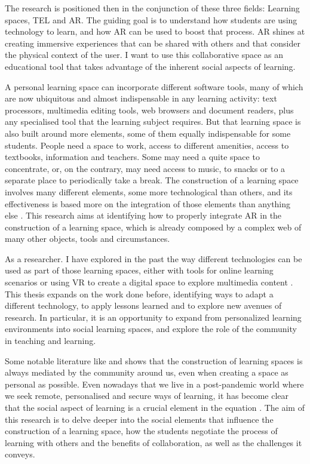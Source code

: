 The research is positioned then in the conjunction of these three fields: Learning spaces, \ac{TEL} and \ac{AR}. The guiding goal is to
understand how students are using technology to learn, and how \ac{AR} can be used to boost that process. \ac{AR} shines at creating
immersive experiences that can be shared with others and that consider the physical context of the user. I want to use this collaborative
space as an educational tool that takes advantage of the inherent social aspects of learning.

A personal learning space can incorporate different software tools, many of which  are now ubiquitous and almost
indispensable in any learning activity: text processors, multimedia editing tools, web browsers and document readers, plus any
specialised tool that the learning subject requires. But that learning space is also built around more elements, some of them equally
indispensable for some students. People need a space to work, access to different amenities, access to textbooks, information and
teachers. Some may need a quite space to concentrate, or, on the contrary, may need access to music, to snacks or to a separate place to
periodically take a break. The construction of a learning space involves many different elements, some more technological than others,
and its effectiveness is based more on the integration of those elements than anything else \parencite{lu_2013,reinius_2021}. This
research aims at identifying how to properly integrate \ac{AR} in the construction of a learning space, which is already composed by a
complex web of many other objects, tools and circumstances.

As a researcher. I have explored in the past the way different technologies can be used as part of those learning spaces, either with
tools for online learning scenarios or using \ac{VR} to create a digital space to explore multimedia content \parencite{gil_2015}. This
thesis expands on the work done before, identifying ways to adapt a different technology, to apply
lessons learned and to explore new avenues of research. In particular, it is an opportunity to expand from personalized learning
environments into social learning spaces, and explore the role of the community in teaching and learning.

Some notable literature like \textcite{richards_2023} and \textcite{long_2005} shows that the construction of learning spaces is always
mediated by the community around us, even when creating a space as personal as possible. Even nowadays that we live in a post-pandemic
world where we seek remote, personalised and secure ways of learning, it has become clear that the social aspect of learning is a crucial
element in the equation \parencite{baber_2021,de-felice_2023}. The aim of this research is to delve deeper into the social elements that
influence the construction of a learning space, how the students negotiate the process of learning with others and the benefits of collaboration,
as well as the challenges it conveys.

